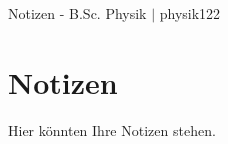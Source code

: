 \documentclass[a4paper,12pt]{article}
\begin{document}

\thispagestyle{empty}
\hfill
\Huge
\begin{center}
        Notizen - B.Sc. Physik $|$ physik122
\end{center}
\normalsize
\hfill


\newpage


\tableofcontents


\newpage





\section{Notizen}
Hier könnten Ihre Notizen stehen.

\end{document}
